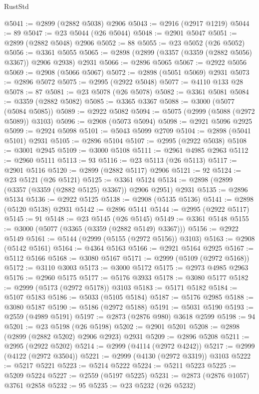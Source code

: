 \begin{lexlean}{RustStd}
\begin{coremodule}
@5041 := @2899 (@2882 @5038) @2906
@5043 := @2916 (@2917 @1219)
@5044 := 89
@5047 := @23 @5044 (@26 @5044)
@5048 := @2901 @5047
@5051 := @2899 (@2882 @5048) @2906
@5052 := 88
@5055 := @23 @5052 (@26 @5052)
@5056 := @3361 @5055
@5065 := @2898 (@2899 (@3357 (@3359 (@2882 @5056) @3367)) @2906 @2938) @2931
@5066 := @2896 @5065
@5067 := @2922 @5056
@5069 := @2908 (@5066 @5067)
@5072 := @2898 (@5051 @5069) @2931
@5073 := @2896 @5072
@5075 := @2995 (@2922 @5048)
@5077 := @4110 @133 @28
@5078 := 87
@5081 := @23 @5078 (@26 @5078)
@5082 := @3361 @5081
@5084 := @3359 (@2882 @5082)
@5085 := @3365 @3367
@5088 := @3000 (@5077 (@5084 @5085))
@5089 := @2922 @5082
@5094 := @5075 (@2999 (@5088 (@2972 @5089)) @3103)
@5096 := @2908 (@5073 @5094)
@5098 := @2921 @5096 @2925
@5099 := @2924 @5098
@5101 := @5043 @5099 @2709
@5104 := @2898 (@5041 @5101) @2931
@5105 := @2896 @5104
@5107 := @2995 (@2922 @5038)
@5108 := @3001 @2945
@5109 := @3000 @5108
@5111 := @2961 @4985 @2963
@5112 := @2960 @5111
@5113 := 93
@5116 := @23 @5113 (@26 @5113)
@5117 := @2901 @5116
@5120 := @2899 (@2882 @5117) @2906
@5121 := 92
@5124 := @23 @5121 (@26 @5121)
@5125 := @3361 @5124
@5134 := @2898 (@2899 (@3357 (@3359 (@2882 @5125) @3367)) @2906 @2951) @2931
@5135 := @2896 @5134
@5136 := @2922 @5125
@5138 := @2908 (@5135 @5136)
@5141 := @2898 (@5120 @5138) @2931
@5142 := @2896 @5141
@5144 := @2995 (@2922 @5117)
@5145 := 91
@5148 := @23 @5145 (@26 @5145)
@5149 := @3361 @5148
@5155 := @3000 (@5077 (@3365 (@3359 (@2882 @5149) @3367)))
@5156 := @2922 @5149
@5161 := @5144 (@2999 (@5155 (@2972 @5156)) @3103)
@5163 := @2908 (@5142 @5161)
@5164 := @4364 @5163
@5166 := @2921 @5164 @2925
@5167 := @5112 @5166
@5168 := @3080 @5167
@5171 := @2999 (@5109 (@2972 @5168))
@5172 := @3110 @3003
@5173 := @3000 @5172
@5175 := @2973 @4985 @2963
@5176 := @2960 @5175
@5177 := @5176 @3933
@5178 := @3080 @5177
@5182 := @2999 (@5173 (@2972 @5178)) @3103
@5183 := @5171 @5182
@5184 := @5107 @5183
@5186 := @5033 (@5105 @5184)
@5187 := @5176 @2985
@5188 := @3080 @5187
@5190 := @5186 (@2972 @5188)
@5191 := @5031 @5190
@5193 := @2559 (@4989 @5191)
@5197 := @2873 (@2876 @980) @3618 @2599
@5198 := 94
@5201 := @23 @5198 (@26 @5198)
@5202 := @2901 @5201
@5208 := @2898 (@2899 (@2882 @5202) @2906 @2923) @2931
@5209 := @2896 @5208
@5211 := @2995 (@2922 @5202)
@5214 := @2999 (@4114 (@2972 @4242))
@5217 := @2999 (@4122 (@2972 @3504))
@5221 := @2999 (@4130 (@2972 @3319)) @3103
@5222 := @5217 @5221
@5223 := @5214 @5222
@5224 := @5211 @5223
@5225 := @5209 @5224
@5227 := @2559 (@5197 @5225)
@5231 := @2873 (@2876 @1057) @3761 @2858
@5232 := 95
@5235 := @23 @5232 (@26 @5232)

\end{coremodule}
\end{lexlean}
